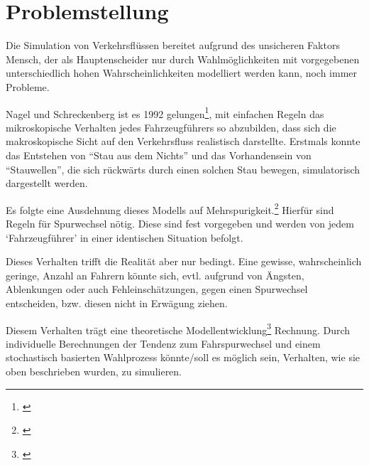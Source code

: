 \section{Problemstellung}
\label{sec:problemstellung}


Die Simulation von Verkehrsflüssen bereitet aufgrund des unsicheren Faktors Mensch, der als Hauptenscheider nur durch Wahlmöglichkeiten mit vorgegebenen unterschiedlich hohen Wahrscheinlichkeiten modelliert werden kann, noch immer Probleme.

Nagel und Schreckenberg ist es 1992 gelungen\footnote{\cite{na-sch}}, mit einfachen Regeln das mikroskopische Verhalten jedes Fahrzeugführers so abzubilden, dass sich die makroskopische Sicht auf den Verkehrsfluss realistisch darstellte.
Erstmals konnte das Entstehen von \enquote{Stau aus dem Nichts} und das Vorhandensein von \enquote{Stauwellen}, die sich rückwärts durch einen solchen Stau bewegen, simulatorisch dargestellt werden.

Es folgte eine Ausdehnung dieses Modells auf Mehrspurigkeit.\footnote{\cite{multi-lane}} 
Hierfür sind Regeln für Spurwechsel nötig.
Diese sind fest vorgegeben und werden von jedem \enquote*{Fahrzeugführer} in einer identischen Situation befolgt.

Dieses Verhalten trifft die Realität aber nur bedingt.
Eine gewisse, wahrscheinlich geringe, Anzahl an Fahrern könnte sich, evtl. aufgrund von Ängsten, Ablenkungen oder auch Fehleinschätzungen, gegen einen Spurwechsel entscheiden, bzw. diesen nicht in Erwägung ziehen.

Diesem Verhalten trägt eine theoretische Modellentwicklung\footnote{\cite{dat-ba}} Rechnung.
Durch individuelle Berechnungen der Tendenz zum Fahrspurwechsel und einem stochastisch basierten Wahlprozess könnte/soll es möglich sein, Verhalten, wie sie oben beschrieben wurden, zu simulieren.


